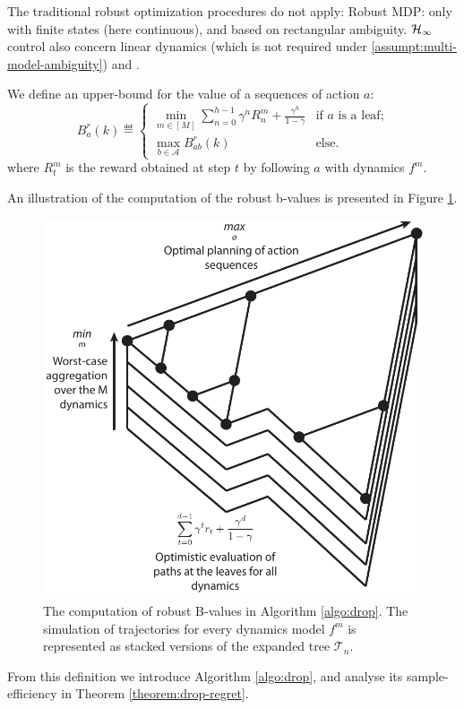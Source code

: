 \documentclass{article}
\begin{document}
The traditional robust optimization procedures do not apply: Robust MDP: only with finite states (here continuous), and based on rectangular ambiguity. $\mathcal{H}_\infty$ control also concern linear dynamics (which is not required under \autoref{assumpt:multi-model-ambiguity}) and .


\begin{definition} We define an upper-bound for the value of a sequences of action $a$:
\begin{equation}
\label{eq:robust-b-values}
B_a^r(k)  \eqdef
\begin{cases}
\min_{m\in[M]} \sum_{n=0}^{h-1} \gamma^n R_n^m  + \frac{\gamma^h}{1-\gamma} &\text{if } a \text{ is a leaf;}\\
\max_{b\in\mathcal{A}} B_{ab}^r(k) & \text{else.}
\end{cases}
\end{equation}
where $R_t^m$ is the reward obtained at step $t$ by following $a$ with dynamics $f^m$.
\end{definition}
An illustration of the computation of the robust b-values is presented in Figure \ref{fig:drop}.

\begin{figure}
\centering
\includegraphics[width=0.4\linewidth]{img/robust-control-tree}
\caption{The computation of robust B-values in Algorithm \ref{algo:drop}. The simulation of trajectories for every dynamics model $f^m$ is represented as stacked versions of the expanded tree $\mathcal{T}_n$.}
\label{fig:drop}
\end{figure}

From this definition we introduce Algorithm \ref{algo:drop}, and analyse its sample-efficiency in Theorem \ref{theorem:drop-regret}.

\end{document}
